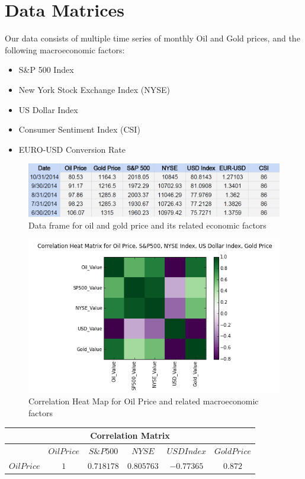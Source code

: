 \documentclass[runningheads]{llncs}
\begin{document}
\newpage
\section{Data Matrices}
Our data consists of multiple time series of monthly Oil and Gold prices, and the following macroeconomic factors:

\begin {itemize}
\item S\&P 500 Index
\item New York Stock Exchange Index (NYSE)
\item US Dollar Index
\item Consumer Sentiment Index (CSI)
\item EURO-USD Conversion Rate
\end {itemize}
 
\begin{figure}
\centering
\includegraphics[width=\textwidth]{DataMatrices.png}
\caption{Data frame for oil and gold price and its related economic factors}
\label{fig:DataMatrices.png}
\end{figure}

\begin{figure}
\centering
\includegraphics[width=\textwidth]{HeatMap_Oil_Daily.png}
\caption{Correlation Heat Map for Oil Price and related macroeconomic factors}
\label{fig:HeatMap_Oil.png}
\end{figure}

\begin{center}
\begin{tabular}{|c|c|c|c|c|c|}
\hline
\multicolumn{6}{|c|}{Correlation Matrix} \\
\hline
$ $ & $Oil Price$ & $ S\&P 500 $ & $ NYSE $ & $ USD Index $ & $Gold Price$ \\ [0.5ex]  \hline
$Oil Price$ & $ 1 $ & $0.718178$ & $0.805763$ & $-0.77365$ & $0.872$ \\ \hline
\end{tabular}
\end{center}
\end{document}
